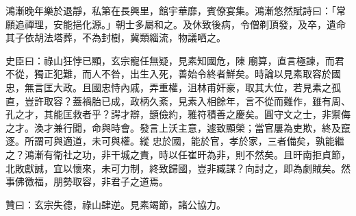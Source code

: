 \begin{pinyinscope}
 鴻漸晚年樂於退靜，私第在長興里，館宇華靡，賓僚宴集。鴻漸悠然賦詩曰：「常願追禪理，安能挹化源。」朝士多屬和之。及休致後病，令僧剃頂發，及卒，遺命其子依胡法塔葬，不為封樹，冀類緇流，物議哂之。



 史臣曰：祿山狂悖已顯，玄宗寵任無疑，見素知國危，陳
 廟算，直言極諫，而君不從，獨正犯難，而人不咎，出生入死，善始令終者鮮矣。時論以見素取容於國忠，無言匡大政。且國忠恃內戚，弄重權，沮林甫奸豪，取其大位，若見素之孤直，豈許取容？蓋禍胎已成，政柄久紊，見素入相餘年，言不從而難作，雖有周、孔之才，其能匡救者乎？諤才辯，顗儉約，雅符積善之慶矣。圓守文之士，非禦侮之才。渙才兼行聞，命與時會。發言上沃主意，遽致顯榮；當官屢為吏欺，終及竄逐。所謂可與適道，未可與權。縱
 忠於國，能於官，孝於家，三者備矣，孰能繼之？鴻漸有衛社之功，非干城之責，時以任崔旰為非，則不然矣。且旰南拒貞節，北敗獻誠，宜以懷來，未可力制，終致歸國，豈非臧謀？向討之，即為劇賊矣。然事佛徼福，朋勢取容，非君子之道焉。



 贊曰：玄宗失德，祿山肆逆。見素竭節，諸公協力。



\end{pinyinscope}